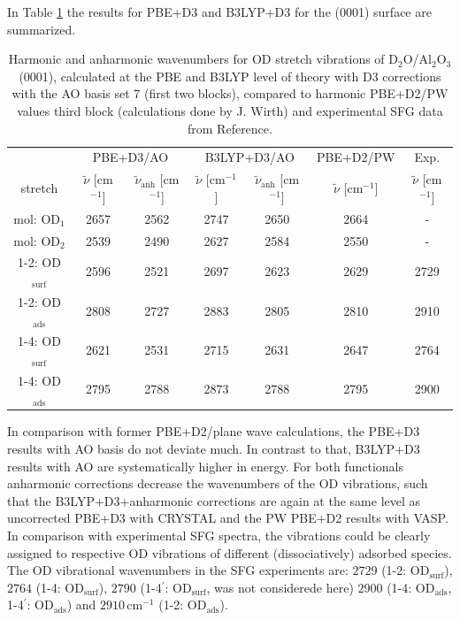 \documentclass[11pt,DIV=13,BCOR=5mm,a4paper,headinclude]{scrbook}
\begin{document}
In Table \ref{tab:freqs_0001_crystal} the results for PBE+D3 and B3LYP+D3 for the (0001) surface are summarized.
\begin{table}[!h]
  \centering
  \caption{Harmonic and anharmonic wavenumbers for OD stretch vibrations of D$_2$O/Al$_2$O$_3$(0001), calculated at the PBE and B3LYP level of theory with D3 corrections with the AO basis set 7 (first two blocks), compared to harmonic PBE+D2/PW values third block (calculations done by J. Wirth\cite{Wirth2014thesis}) and experimental SFG data from Reference\cite{Wirth2014}.}
  \begin{tabular}{ccc|cc|c|c}
  \toprule
   & \multicolumn{2}{c}{PBE+D3/AO} & \multicolumn{2}{c}{B3LYP+D3/AO} &PBE+D2/PW&Exp.\cite{Wirth2014}\\
  stretch & $\tilde{\nu}$ [cm$^{-1}$] &$\tilde{\nu}_\textrm{anh}$ [cm$^{-1}$] &$\tilde{\nu}$ [cm$^{-1}$] & $\tilde{\nu}_\textrm{anh}$ [cm$^{-1}$]& $\tilde{\nu}$ [cm$^{-1}$]& $\tilde{\nu}$ [cm$^{-1}$]\\\midrule
  mol: OD$_{\textrm{1}}$    &2657 &2562 &2747 &2650 & 2664&-\\
  mol: OD$_{\textrm{2}}$    &2539 &2490 &2627 &2584 & 2550&-\\
  1-2: OD$_{\textrm{surf}}$ &2596 &2521 &2697 &2623 & 2629&2729\\%
  1-2: OD$_{\textrm{ads}}$  &2808 &2727 &2883 &2805 & 2810&2910\\%
  1-4: OD$_{\textrm{surf}}$ &2621 &2531 &2715 &2631 & 2647&2764\\%
  1-4: OD$_{\textrm{ads}}$  &2795 &2788 &2873 &2788 & 2795&2900\\%
  \bottomrule
    \end{tabular}
  \label{tab:freqs_0001_crystal}
\end{table}
In comparison with former PBE+D2/plane wave calculations, the PBE+D3 results with AO basis do not deviate much.
In contrast to that, B3LYP+D3 results with AO are systematically higher in energy.
For both functionals anharmonic corrections decrease the wavenumbers of the OD vibrations, such that the B3LYP+D3+anharmonic corrections are again at the same level as uncorrected PBE+D3 with CRYSTAL and the PW PBE+D2 results with VASP.
In comparison with experimental SFG spectra\cite{Wirth2014}, the vibrations could be clearly assigned to respective OD vibrations of different (dissociatively) adsorbed species.
The OD vibrational wavenumbers in the SFG experiments\cite{Wirth2014} are: $2729$ (1-2: OD$_{\textrm{surf}}$), $2764$ (1-4: OD$_{\textrm{surf}}$), $2790$ (1-4$^\prime$: OD$_{\textrm{surf}}$, was not considerede here) $2900$ (1-4: OD$_{\textrm{ads}}$, 1-4$^\prime$: OD$_{\textrm{ads}}$) and $2910\,$cm$^{-1}$ (1-2: OD$_{\textrm{ads}}$).
\end{document}
